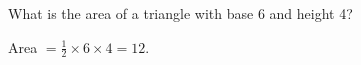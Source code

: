 \question What is the area of a triangle with base 6 and height 4?
\begin{solution}
Area $= \frac{1}{2} \times 6 \times 4 = 12$.
\end{solution}

